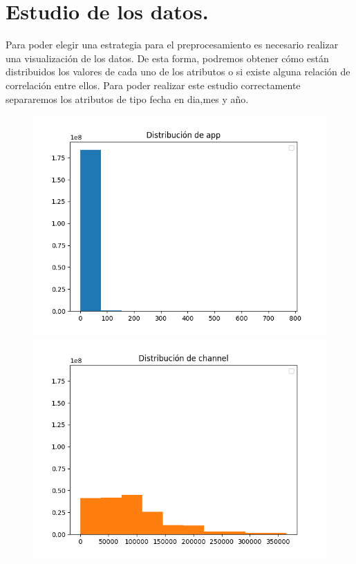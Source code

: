 \section{Estudio de los datos.}
Para poder elegir una estrategia para el preprocesamiento es necesario realizar una visualización de los datos. De esta forma, podremos obtener cómo están distribuidos los valores de cada uno de los atributos o si existe alguna relación de correlación entre ellos. Para poder realizar este estudio correctamente separaremos los atributos de tipo fecha en dia,mes y año. 
\begin{figure}
\includegraphics[scale=0.5]{img/app_distribution.png}
\includegraphics[scale=0.5]{img/channel_distribution.png}

\end{figure}

